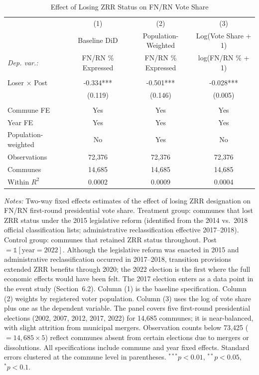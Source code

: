 \begin{table}[htbp]
\centering
\caption{Effect of Losing ZRR Status on FN/RN Vote Share}
\label{tab:main_did}
\begin{tabular}{lccc}
\toprule
 & (1) & (2) & (3) \\
 & Baseline DiD & Population-Weighted & Log(Vote Share + 1) \\
\midrule
\textit{Dep. var.:} & FN/RN \% Expressed & FN/RN \% Expressed & log(FN/RN \% + 1) \\
 & & & \\
Loser $\times$ Post & -0.334*** & -0.501*** & -0.028*** \\
 & (0.119) & (0.146) & (0.005) \\
 & & & \\
Commune FE & Yes & Yes & Yes \\
Year FE & Yes & Yes & Yes \\
Population-weighted & No & Yes & No \\
\midrule
Observations & 72{,}376 & 72{,}376 & 72{,}376 \\
Communes & 14{,}685 & 14{,}685 & 14{,}685 \\
Within $R^2$ & 0.0002 & 0.0009 & 0.0004 \\
\bottomrule
\end{tabular}
\vspace{0.3em}
\parbox{\textwidth}{\footnotesize
\textit{Notes:} Two-way fixed effects estimates of the effect of losing ZRR designation on FN/RN first-round presidential vote share.
Treatment group: communes that lost ZRR status under the 2015 legislative reform (identified from the 2014 vs.\ 2018 official classification lists; administrative reclassification effective 2017--2018). Control group: communes that retained ZRR status throughout.
Post $= \mathbb{1}[\text{year} = 2022]$. Although the legislative reform was enacted in 2015 and administrative reclassification occurred in 2017--2018, transition provisions extended ZRR benefits through 2020; the 2022 election is the first where the full economic effects would have been felt. The 2017 election enters as a data point in the event study (Section~6.2).
Column (1) is the baseline specification.
Column (2) weights by registered voter population.
Column (3) uses the log of vote share plus one as the dependent variable.
The panel covers five first-round presidential elections (2002, 2007, 2012, 2017, 2022) for 14{,}685 communes; it is near-balanced, with slight attrition from municipal mergers.
Observation counts below 73{,}425 ($= 14{,}685 \times 5$) reflect communes absent from certain elections due to mergers or dissolutions.
All specifications include commune and year fixed effects.
Standard errors clustered at the commune level in parentheses.
$^{***}p<0.01$, $^{**}p<0.05$, $^{*}p<0.1$.}
\end{table}
